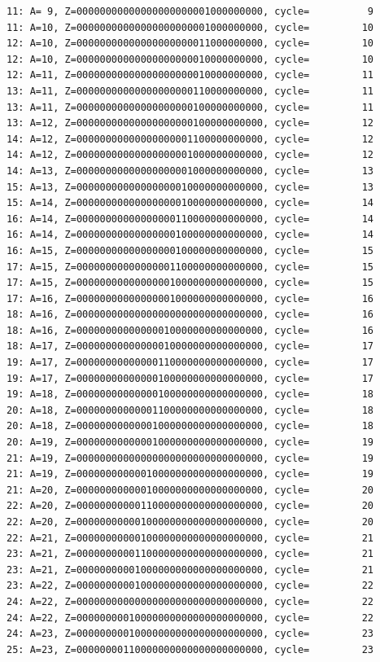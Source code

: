 \documentclass[11pt]{article}
\begin{document}
\begin{verbatim}
11: A= 9, Z=00000000000000000000001000000000, cycle=          9
11: A=10, Z=00000000000000000000001000000000, cycle=         10
12: A=10, Z=00000000000000000000011000000000, cycle=         10
12: A=10, Z=00000000000000000000010000000000, cycle=         10
12: A=11, Z=00000000000000000000010000000000, cycle=         11
13: A=11, Z=00000000000000000000110000000000, cycle=         11
13: A=11, Z=00000000000000000000100000000000, cycle=         11
13: A=12, Z=00000000000000000000100000000000, cycle=         12
14: A=12, Z=00000000000000000001100000000000, cycle=         12
14: A=12, Z=00000000000000000001000000000000, cycle=         12
14: A=13, Z=00000000000000000001000000000000, cycle=         13
15: A=13, Z=00000000000000000010000000000000, cycle=         13
15: A=14, Z=00000000000000000010000000000000, cycle=         14
16: A=14, Z=00000000000000000110000000000000, cycle=         14
16: A=14, Z=00000000000000000100000000000000, cycle=         14
16: A=15, Z=00000000000000000100000000000000, cycle=         15
17: A=15, Z=00000000000000001100000000000000, cycle=         15
17: A=15, Z=00000000000000001000000000000000, cycle=         15
17: A=16, Z=00000000000000001000000000000000, cycle=         16
18: A=16, Z=00000000000000000000000000000000, cycle=         16
18: A=16, Z=00000000000000010000000000000000, cycle=         16
18: A=17, Z=00000000000000010000000000000000, cycle=         17
19: A=17, Z=00000000000000110000000000000000, cycle=         17
19: A=17, Z=00000000000000100000000000000000, cycle=         17
19: A=18, Z=00000000000000100000000000000000, cycle=         18
20: A=18, Z=00000000000001100000000000000000, cycle=         18
20: A=18, Z=00000000000001000000000000000000, cycle=         18
20: A=19, Z=00000000000001000000000000000000, cycle=         19
21: A=19, Z=00000000000000000000000000000000, cycle=         19
21: A=19, Z=00000000000010000000000000000000, cycle=         19
21: A=20, Z=00000000000010000000000000000000, cycle=         20
22: A=20, Z=00000000000110000000000000000000, cycle=         20
22: A=20, Z=00000000000100000000000000000000, cycle=         20
22: A=21, Z=00000000000100000000000000000000, cycle=         21
23: A=21, Z=00000000001100000000000000000000, cycle=         21
23: A=21, Z=00000000001000000000000000000000, cycle=         21
23: A=22, Z=00000000001000000000000000000000, cycle=         22
24: A=22, Z=00000000000000000000000000000000, cycle=         22
24: A=22, Z=00000000010000000000000000000000, cycle=         22
24: A=23, Z=00000000010000000000000000000000, cycle=         23
25: A=23, Z=00000000110000000000000000000000, cycle=         23

\end{verbatim}
\end{document}
